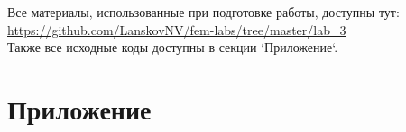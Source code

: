 \documentclass[12pt]{article}
\begin{document}
Все материалы, использованные при подготовке работы, доступны тут: \\
\url{https://github.com/LanskovNV/fem-labs/tree/master/lab_3} \\
Также все исходные коды доступны в секции `Приложение`.

\section{Приложение}




\end{document}
